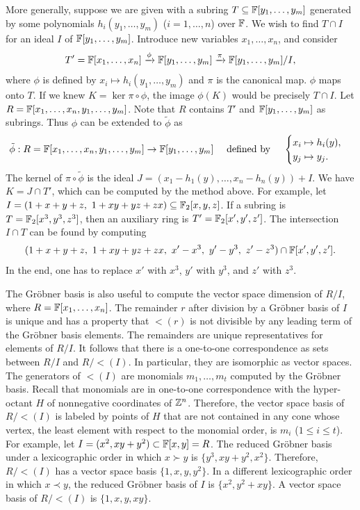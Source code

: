 More generally, suppose we are given with a subring $T \subseteq \mathbb{F}[y_1,\ldots,y_m]$
generated by some polynomials $h_i (y_1,\ldots,y_m)$ ($i=1,\ldots,n$) over $\mathbb{F}$.
We wish to find $T \cap I$ for an ideal $I$ of $\mathbb{F}[y_1,\ldots,y_m]$.
Introduce new variables $x_1,\ldots,x_n$, and consider 
\[
T' = \mathbb{F}[x_1, \ldots, x_n] \xrightarrow{\phi} \mathbb{F}[y_1,\ldots,y_m] \xrightarrow{\pi} \mathbb{F}[y_1,\ldots,y_m] / I,
\]
where $\phi$ is defined by $x_i \mapsto h_i(y_1,\ldots,y_m)$ and $\pi$ is the canonical map.
$\phi$ maps onto $T$.
If we knew $K = \ker \pi \circ \phi$, the image $\phi(K)$ would be precisely $T \cap I$.
Let $R = \mathbb{F}[x_1,\ldots,x_n,y_1,\ldots,y_m]$.
Note that $R$ contains $T'$ and $\mathbb{F}[y_1,\ldots,y_m]$ as subrings.
Thus $\phi$ can be extended to $\tilde \phi$ as
\[
 \tilde \phi: R = \mathbb{F}[x_1,\ldots,x_n,y_1,\ldots,y_m] \to \mathbb{F}[y_1,\ldots,y_m] \quad \text{ defined by } \quad 
\begin{cases} x_i \mapsto h_i(y), \\ y_j \mapsto y_j . \end{cases}
\]
The kernel of $\pi \circ \tilde \phi$ is the ideal $J = (x_1 - h_1(y), \ldots, x_n - h_n(y) ) + I$.
We have $K = J \cap T'$, which can be computed by the method above.
%
For example, let $I = (1+x+y+z,~1+xy+yz+zx) \subseteq \mathbb{F}_2[x,y,z]$. 
If a subring is $T = \mathbb{F}_2[x^3,y^3,z^3]$, then an auxiliary ring is $T' = \mathbb{F}_2[x',y',z']$.
The intersection $I \cap T$ can be found by computing
\[
 (1+x+y+z,~1+xy+yz+zx,~x'-x^3,~y'-y^3,~z'-z^3) \cap \mathbb{F}[x',y',z'].
\]
In the end, one has to replace $x'$ with $x^3$, $y'$ with $y^3$, and $z'$ with $z^3$.


The Gr\"obner basis is also useful to compute the vector space dimension of $R/I$, where $R=\mathbb{F}[x_1,\ldots,x_n]$.
The remainder $r$ after division by a Gr\"obner basis of $I$ is unique
and has a property that $\lt(r)$ is not divisible by any leading term of the Gr\"obner basis elements.
The remainders are unique representatives for elements of $R/I$.
It follows that there is a one-to-one correspondence as sets between $R/I$ and $R/\lt(I)$.
In particular, they are isomorphic as vector spaces.
The generators of $\lt(I)$ are monomials $m_1,\ldots,m_t$ computed by the Gr\"obner basis.
Recall that monomials are in one-to-one correspondence with the hyper-octant $H$ of nonnegative coordinates of $\mathbb{Z}^n$.
Therefore, the vector space basis of $R/\lt(I)$ is labeled by points of $H$
that are not contained in any cone whose vertex, the least element with respect to the monomial order, is $m_i$ ($1\le i \le t$).
For example, let $I = (x^2,xy+y^2) \subset \mathbb{F}[x,y]=R$.
The reduced Gr\"obner basis under a lexicographic order in which $x \succ y$ is $\{ y^3, xy+y^2,x^2 \}$.
Therefore, $R/\lt(I)$ has a vector space basis $\{1,x,y,y^2\}$.
In a different lexicographic order in which $x \prec y$, the reduced Gr\"obner basis of $I$ is
$\{x^2,y^2+xy\}$. A vector space basis of $R/\lt(I)$ is $\{1, x, y, xy \}$.


